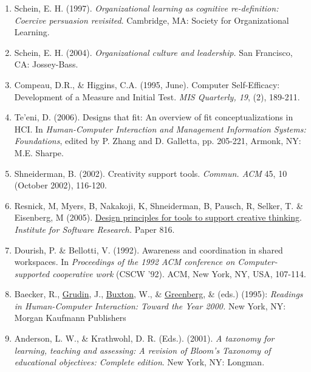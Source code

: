 \begin{enumerate}
\itemsep1pt\parskip0pt
\item
  Schein, E. H. (1997). \emph{Organizational learning as cognitive
  re-definition: Coercive persuasion revisited}. Cambridge, MA: Society
  for Organizational Learning.
\item
  Schein, E. H. (2004). \emph{Organizational culture and leadership.}
  San Francisco, CA: Jossey-Bass.
\item
  Compeau, D.R., \& Higgins, C.A. (1995, June). Computer Self-Efficacy:
  Development of a Measure and Initial Test. \emph{MIS Quarterly, 19},
  (2), 189-211.
\item
  Te'eni, D. (2006). Designs that fit: An overview of fit
  conceptualizations in HCI. In \emph{Human-Computer Interaction and
  Management Information Systems: Foundations}, edited by P. Zhang and
  D. Galletta, pp. 205-221, Armonk, NY: M.E. Sharpe.
\item
  Shneiderman, B. (2002). Creativity support tools. \emph{Commun. ACM}
  45, 10 (October 2002), 116-120.
\item
  Resnick, M, Myers, B, Nakakoji, K, Shneiderman, B, Pausch, R, Selker,
  T. \& Eisenberg, M (2005).
  \href{http://repository.cmu.edu/isr/816}{Design principles for tools
  to support creative thinking}. \emph{Institute for Software Research.}
  Paper 816.
\item
  Dourish, P. \& Bellotti, V. (1992). Awareness and coordination in
  shared workspaces. In \emph{Proceedings of the 1992 ACM conference on
  Computer-supported cooperative work} (CSCW '92). ACM, New York, NY,
  USA, 107-114.
\item
  Baecker, R., \href{http://www.interaction-design.org/references/authors/jonathan_grudin.html}{Grudin},
  J.,
\href{http://www.interaction-design.org/references/authors/william_buxton.html}{Buxton},
  W., \&
\href{http://www.interaction-design.org/references/authors/saul_greenberg.html}{Greenberg}, \& (eds.) (1995): \emph{Readings in Human-Computer Interaction: Toward
  the Year 2000.} New York, NY: Morgan Kaufmann Publishers
\item
  Anderson, L. W., \& Krathwohl, D. R. (Eds.). (2001). \emph{A taxonomy
  for learning, teaching and assessing: A revision of Bloom's Taxonomy
  of educational objectives: Complete edition}. New York, NY: Longman.
\end{enumerate}
